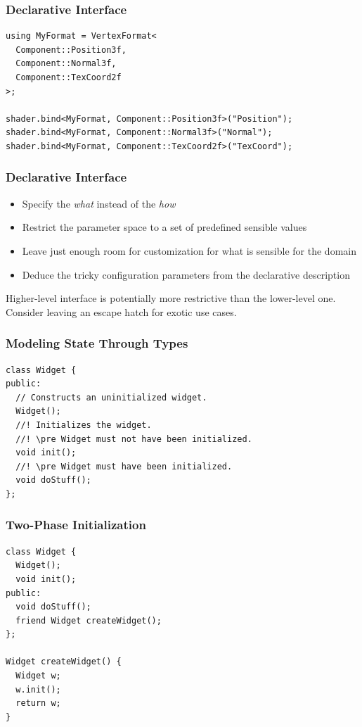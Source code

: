 \documentclass[aspectratio=169]{beamer}
\newif\iftransitions
\newcommand{\cpause}{\iftransitions \pause \fi}
\begin{document}
\begin{frame}[fragile]
  \frametitle{Declarative Interface}
  \begin{lstlisting}[style=cpp20]
using MyFormat = VertexFormat<
  Component::Position3f,
  Component::Normal3f,
  Component::TexCoord2f
>;

shader.bind<MyFormat, Component::Position3f>("Position");
shader.bind<MyFormat, Component::Normal3f>("Normal");
shader.bind<MyFormat, Component::TexCoord2f>("TexCoord");
  \end{lstlisting}
\end{frame}

\begin{frame}
  \frametitle{Declarative Interface}
  
  \begin{itemize}
  \item Specify the \textit{what} instead of the \textit{how}
  \item Restrict the parameter space to a set of predefined sensible values
  \item Leave just enough room for customization for what is sensible for the domain
  \item Deduce the tricky configuration parameters from the declarative description
  \end{itemize}
  
  Higher-level interface is potentially more restrictive than the lower-level one. Consider leaving an escape hatch for exotic use cases.
\end{frame}

\begin{frame}[fragile]
  \frametitle{Modeling State Through Types}
  \cpause
  \begin{lstlisting}[style=cpp20]
class Widget {
public:
  // Constructs an uninitialized widget.
  Widget();
  //! Initializes the widget.
  //! \pre Widget must not have been initialized.
  void init();
  //! \pre Widget must have been initialized.
  void doStuff();
};
  \end{lstlisting}
  
\end{frame}

\begin{frame}[fragile]
  \frametitle{Two-Phase Initialization}

  \begin{lstlisting}[style=cpp20]
class Widget {
  Widget();
  void init();
public:
  void doStuff();
  friend Widget createWidget();
};

Widget createWidget() {
  Widget w;
  w.init();
  return w;
}
  \end{lstlisting}
  
\end{frame}
\end{document}
